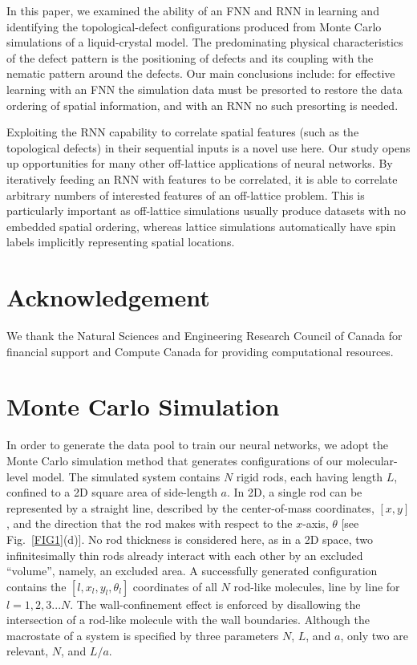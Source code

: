 In this paper, we examined the ability of an FNN and RNN in learning and identifying the topological-defect configurations produced from Monte Carlo simulations of a liquid-crystal model. The predominating physical characteristics of the defect pattern is the positioning of defects and its coupling with the nematic pattern around the defects. Our main conclusions include: for effective learning with an FNN the simulation data must be presorted to restore the data ordering of spatial information, and with an RNN no such presorting is needed.

Exploiting the RNN capability to correlate spatial features (such as the topological defects) in their sequential inputs is a novel use here.
Our study opens up opportunities for many other off-lattice applications of neural networks. By iteratively feeding an RNN with features to be correlated, it is able to correlate arbitrary numbers of interested features of an off-lattice problem. This is particularly important as off-lattice simulations usually produce datasets with no embedded spatial ordering, whereas lattice simulations automatically have spin labels implicitly representing spatial locations.



\section{Acknowledgement}
We thank the Natural Sciences and Engineering Research Council of Canada for financial support and Compute Canada for providing computational resources.



\section{Monte Carlo Simulation}\label{MC}

In order to generate the data pool to train our neural networks, we adopt the Monte Carlo simulation method that generates configurations of our molecular-level model. The simulated system contains $N$ rigid rods, each having length $L$, confined to a 2D square area of side-length $a$. In 2D, a single rod can be represented by a straight line, described by the center-of-mass coordinates, $[x, y]$, and the direction that the rod  makes with respect to the $x$-axis, $\theta$ [see Fig.\ \ref{FIG1}(d)]. No rod thickness is considered here, as in a 2D space, two infinitesimally thin rods already interact with each other by an excluded ``volume'', namely, an excluded area. A successfully generated configuration contains the $[l, x_l,y_l,\theta_l]$ coordinates of all $N$ rod-like molecules, line by line for $l=1,2,3...N$. The wall-confinement effect is enforced by disallowing the intersection of a rod-like molecule with the wall boundaries. Although the macrostate of a system is specified by three parameters $N$, $L$, and $a$, only two are relevant, $N$, and $L/a$.

